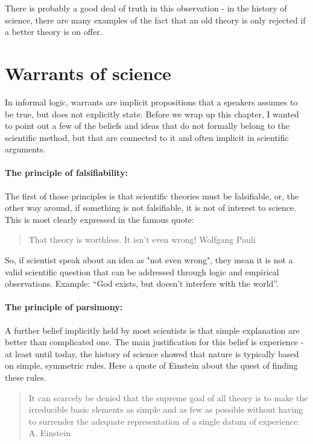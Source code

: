\documentclass{tufte-book}
\begin{document}
There is probably a good deal of truth in this observation - in the history of science, there are many examples of the fact that an old theory is only rejected if a better theory is on offer.


\section{Warrants of science}

In informal logic, warrants are implicit propositions that a speakers assumes to be true, but does not explicitly state. Before we wrap up this chapter, I wanted to point out a few of the beliefs and ideas that do not formally belong to the scientific method, but that are connected to it and often implicit in scientific arguments.

\paragraph{The principle of falsifiability:} The first of those principles is that scientific theories must be falsifiable, or, the other way around, if something is not falsifiable, it is not of interest to science. This is most clearly expressed in the famous quote:
\begin{quote}
That theory is worthless. It isn't even wrong! Wolfgang Pauli
\end{quote}
So, if scientist speak about an idea as "not even wrong", they mean it is not a valid scientific question that can be addressed through logic and empirical observations. Example: “God exists, but doesn’t interfere with the world”.

\paragraph{The principle of parsimony:} A further belief implicitly held by most scientists is that simple explanation are better than complicated one. The main justification for this belief is experience - at least until today, the history of science showed that nature is typically based on simple, symmetric rules. Here a quote of Einstein about the quest of finding these rules.


\begin{quote}
It can scarcely be denied that the supreme goal of all theory is to make the irreducible basic elements as simple and as few as possible without having to surrender the adequate representation of a single datum of experience. A. Einstein
\end{quote}
\end{document}
